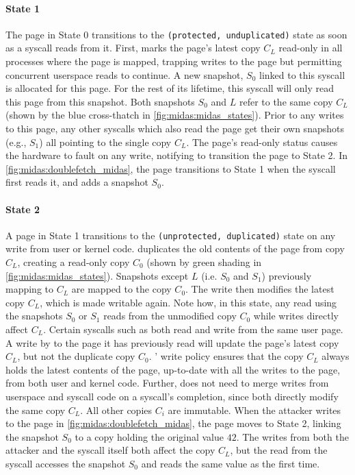 \paragraph{State 1}
The page in State 0 transitions to the \texttt{(protected, unduplicated)} state as soon as a syscall
reads from it.
First, \midas marks the page's latest copy $C_L$ read-only in all processes
where the page is mapped,
trapping writes to the page but permitting concurrent userspace reads to continue.
A new snapshot, $S_0$ linked to this syscall is allocated for this page.
For the rest of its lifetime, this syscall will only read this page from this snapshot.
Both snapshots $S_0$ and $L$ refer to the same copy $C_L$ (shown by the
blue cross-thatch in \autoref{fig:midas:midas_states}).
Prior to any writes to this page, any other syscalls which also read the page
get their own snapshots (e.g., $S_1$) all pointing to the single copy $C_L$.
The page's read-only status causes the hardware to fault on any write,
notifying \midas to transition the page to State 2.
In \autoref{fig:midas:doublefetch_midas}, the page transitions to State 1 when
the syscall first reads it, and adds a snapshot $S_0$.

\paragraph{State 2}
A page in State 1 transitions to the \texttt{(unprotected, duplicated)} state
on any write from user or kernel code.
\midas duplicates the old contents of the page from copy $C_L$, creating a
read-only copy $C_0$ (shown by green shading in \autoref{fig:midas:midas_states}).
Snapshots except $L$ (i.e. $S_0$ and $S_1$) previously mapping to $C_L$ are
mapped to the copy $C_0$.
The write then modifies the latest copy $C_L$, which is made writable again.
Note how, in this state, any read using the snapshots $S_0$ or $S_1$ reads
from the unmodified copy $C_0$ while writes directly affect $C_L$.
Certain syscalls such as  both read and write from
the same user page.
A write by  to the page it has previously read will update
the page's latest copy $C_L$, but not the duplicate copy $C_0$.
\midas' write policy ensures that the copy $C_L$ always holds the latest
contents of the page, up-to-date with all the writes to the page, from both user
and kernel code.
Further, \midas does not need to merge writes from userspace and syscall code
on a syscall's completion, since both directly modify the same copy $C_L$.
All other copies $C_i$ are immutable.
When the attacker writes to the page in \autoref{fig:midas:doublefetch_midas}, the
page moves to State 2, linking the snapshot $S_0$ to a copy holding the
original value $42$.
The writes from both the attacker and the syscall itself both affect
the copy $C_L$, but the read from the syscall accesses the snapshot $S_0$
and reads the same value as the first time.


